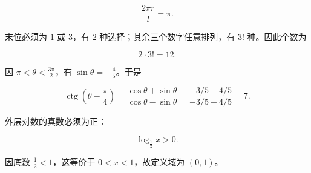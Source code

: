 \begin{answer}
\nopagebreak[4]
\[
\frac{2\pi r}{l}=\pi.
\]


末位必须为 $1$ 或 $3$，有 2 种选择；其余三个数字任意排列，有 $3!$ 种。因此个数为

\nopagebreak[4]
\[
2\cdot3!=12.
\]


因 $\pi<\theta<\frac{3\pi}2$，有 $\sin\theta=-\frac45$。于是

\nopagebreak[4]
\[
\operatorname{ctg}\left(\theta-\frac\pi4\right)
=\frac{\cos\theta+\sin\theta}{\cos\theta-\sin\theta}
=\frac{-3/5-4/5}{-3/5+4/5}=7.
\]


外层对数的真数必须为正：

\nopagebreak[4]
\[
\log_{\frac12}x>0.
\]

因底数 $\frac12<1$，这等价于 $0<x<1$，故定义域为 $(0,1)$。











\end{answer}
